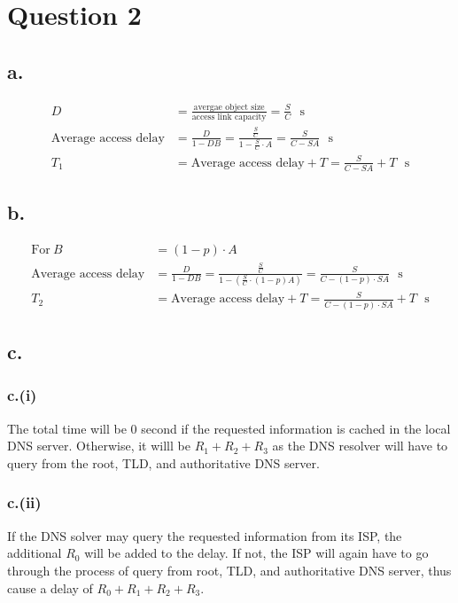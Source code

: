 \documentclass[12pt]{article}
\begin{document}
\section{Question 2}

\subsection{a.}

\begin{align*}
    D &= \frac{\text{avergae object size}}{\text{access link capacity}} = \frac{S}{C}\ \ \ \text{s}\\
    \text{Average access delay} &= \frac{D}{1-DB} = \frac{\frac{S}{C}}{1-\frac{S}{C} \cdot A} = \frac{S}{C-SA}\ \ \ \text{s} \\
    T_1 &= \text{Average access delay} + T = \frac{S}{C-SA} + T \ \ \ \text{s}
\end{align*}


\subsection{b.}

\begin{align*}
    \text{For} \ B &= (1-p) \cdot A \\
    \text{Average access delay} &= \frac{D}{1-DB} = \frac{\frac{S}{C}}{1-(\frac{S}{C} \cdot (1-p) A)} = \frac{S}{C-(1-p) \cdot SA}\ \ \ \text{s} \\
    T_2 &= \text{Average access delay} + T = \frac{S}{C-(1-p) \cdot SA} + T \ \ \ \text{s}
\end{align*}

\subsection{c.}
\subsubsection{c.(i)}
The total time will be $0$ second if the requested information is cached in the local DNS server. Otherwise, it willl be $R_1 + R_2 + R_3$ as the DNS resolver will have to query from the root, TLD, and authoritative DNS server.


\subsubsection{c.(ii)}
If the DNS solver may query the requested information from its ISP, the additional $R_0$ will be added to the delay. If not, the ISP will again have to go through the process of query from root, TLD, and authoritative DNS server, thus cause a delay of $R_0 + R_1 + R_2 + R_3$.
\end{document}

